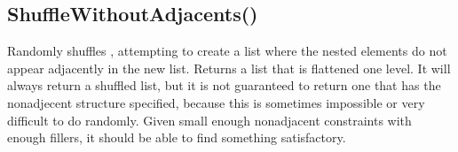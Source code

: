 \documentclass[letterpaper,10pt,english]{sphinxmanual}
\begin{document}
\ignorespaces 

\subsection{ShuffleWithoutAdjacents()}
\label{\detokenize{reference/design:shufflewithoutadjacents}}\label{\detokenize{reference/design:index-19}}
\sphinxAtStartPar
{}

\sphinxAtStartPar
Randomly shuffles  , attempting to   create a list where the nested elements do not appear adjacently in   the new list. Returns a list that is flattened one level. It will   always return a shuffled list, but it is not guaranteed to return   one that has the non\sphinxhyphen{}adjecent structure specified, because this is   sometimes impossible or very difficult to do randomly.  Given small   enough non\sphinxhyphen{}adjacent constraints with enough fillers, it should be   able to find something satisfactory.

\sphinxAtStartPar
{}

\begin{sphinxVerbatim}[commandchars=\\\{\}]
\end{sphinxVerbatim}

\sphinxAtStartPar
{}
\end{document}
